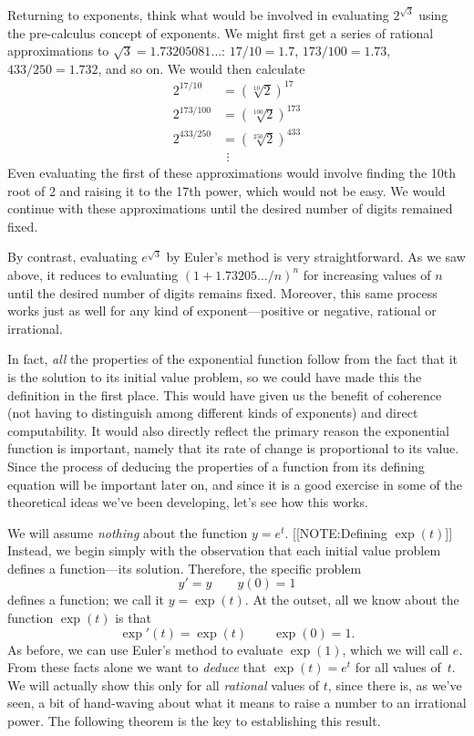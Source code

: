 Returning to exponents, think what would be involved in evaluating
$2^{\sqrt{3}}$ using the pre-calculus concept of exponents.  We might
first get a series of rational approximations to
$\sqrt{3}=1.73205081\ldots$: $17/10=1.7$, $173/100=1.73$,
$433/250=1.732$, and so on.  We would then calculate
\begin{align*}
2^{17/10}&=(\sqrt[10]{2})^{17} \\
2^{173/100}&=(\sqrt[100]{2})^{173} \\
2^{433/250}&=(\sqrt[250]{2})^{433} \\
           &\ \, \vdots
\end{align*}
Even evaluating the first of these approximations would involve
finding the 10th root of 2 and raising it to the 17th power, which
would not be easy.  We would continue with these approximations until
the desired number of digits remained fixed.

By contrast, evaluating $e^{\sqrt{3}}$ by Euler's method is very
straightforward.  As we saw above, it reduces to evaluating
$(1+1.73205\ldots/n)^n$ for increasing values of $n$ until the desired
number of digits remains fixed.  Moreover, this same process works
just as well for any kind of exponent---positive or negative, rational
or irrational.

In fact, {\em all} the properties of the exponential function follow
from the fact that it is the solution to its initial value problem, so
we could have made this the definition in the first place.  This would
have given us the benefit of coherence (not having to distinguish
among different kinds of exponents) and direct computability.  It
would also directly reflect the primary reason the exponential
function is important, namely that its rate of change is proportional
to its value.  Since the process of deducing the properties of a
function from its defining equation will be important later on, and
since it is a good exercise in some of the theoretical ideas we've
been developing, let's see how this works.

We will assume {\em nothing\/} about the function $y = e^t$.  
[[NOTE:Defining $\exp(t)$]]
Instead, we begin simply with the observation that each initial value
problem defines a function---its solution.  Therefore, the specific
problem
	\[
y' = y \qquad y(0) = 1
\]
defines a function;\index{$\exp$} 
we call it $y = \exp(t)$.  At the outset, all we know about the function $\exp(t)$ is that
	\[
\exp'(t) = \exp(t) \qquad \exp(0) = 1.
\]
As before, we can use Euler's method to evaluate $\exp(1)$, which we
will call $e$.  From these facts alone we want to {\em deduce\/} that
$\exp(t)=e^t$ for all values of~$t$.  We will actually show this only
for all {\em rational} values of $t$, since there is, as we've seen, a
bit of hand-waving about what it means to raise a number to an
irrational power. The following theorem is the key to establishing
this result.





